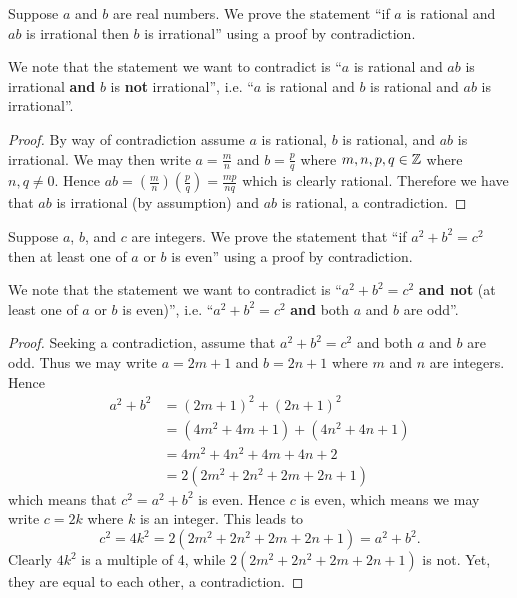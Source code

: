 \begin{example}
    Suppose $a$ and $b$ are real numbers. We prove the statement ``if $a$ is rational and $ab$ is irrational then $b$ is irrational'' using a proof by contradiction.

    We note that the statement we want to contradict is ``$a$ is rational and $ab$ is irrational \textbf{and} $b$ is \textbf{not} irrational'', i.e. ``$a$ is rational and $b$ is rational and $ab$ is irrational''.
    \begin{proof}
        By way of contradiction assume $a$ is rational, $b$ is rational, and $ab$ is irrational. We may then write $a = \frac mn$ and $b = \frac pq$ where $m, n, p, q \in \mathbb{Z}$ where $n, q \neq 0$. Hence $ab = \left(\frac mn\right)\left(\frac pq\right) = \frac{mp}{nq}$ which is clearly rational. Therefore we have that $ab$ is irrational (by assumption) and $ab$ is rational, a contradiction.
    \end{proof}
\end{example}

\begin{example}
    Suppose $a$, $b$, and $c$ are integers. We prove the statement that ``if $a^2 + b^2 = c^2$ then at least one of $a$ or $b$ is even'' using a proof by contradiction.

    We note that the statement we want to contradict is ``$a^2 + b^2 = c^2$ \textbf{and not} (at least one of $a$ or $b$ is even)'', i.e. ``$a^2 + b^2 = c^2$ \textbf{and} both $a$ and $b$ are odd''.
    \begin{proof}
        Seeking a contradiction, assume that $a^2 + b^2 = c^2$ and both $a$ and $b$ are odd. Thus we may write $a = 2m + 1$ and $b = 2n + 1$ where $m$ and $n$ are integers. Hence
        \begin{align*}
            a^2 + b^2 &= (2m+1)^2 + (2n+1)^2\\
            &= (4m^2+4m+1) + (4n^2+4n+1)\\
            &= 4m^2 + 4n^2 + 4m + 4n + 2\\
            &= 2(2m^2 + 2n^2 + 2m + 2n +1)
        \end{align*}
        which means that $c^2 = a^2 + b^2$ is even. Hence $c$ is even, which means we may write $c = 2k$ where $k$ is an integer. This leads to
        \[
            c^2 = 4k^2 = 2(2m^2 + 2n^2 + 2m + 2n + 1) = a^2 + b^2.
        \]
        Clearly $4k^2$ is a multiple of 4, while $2(2m^2 + 2n^2 + 2m + 2n + 1)$ is not. Yet, they are equal to each other, a contradiction.
    \end{proof}
\end{example}

